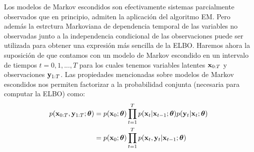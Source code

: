 Los modelos de Markov escondidos son efectivamente sistemas parcialmente observados que en principio, admiten la aplicación del algoritmo EM. Pero además la estrctura Markoviana de dependencia temporal de las variables no observadas junto a la independencia condicional de las observaciones puede ser utilizada para obtener una expresión más sencilla de la ELBO. Haremos ahora la suposición de que contamos con un modelo de Markov escondido en un intervalo de tiempos $t = 0, 1, ..., T$ para los cuales tenemos variables latentes $\mathbf{x}_{0:T}$ y observaciones $\mathbf{y}_{1:T}$. Las propiedades mencionadas sobre modelos de Markov escondidos nos permiten factorizar a la probabilidad conjunta (necesaria para computar la ELBO) como:
\begin{align}
    p(\mathbf{x}_{0:T}, \mathbf{y}_{1:T} ; \mbox{\boldmath$ \theta $}) &= p(\mathbf{x}_0 ; \mbox{\boldmath$ \theta $}) \prod_{t=1}^T p(\mathbf{x}_t | \mathbf{x}_{t-1} ; \mbox{\boldmath$ \theta $}) p(\mathbf{y}_t | \mathbf{x}_t ; \mbox{\boldmath$ \theta $}) \\
    &= p(\mathbf{x}_0 ; \mbox{\boldmath$ \theta $}) \prod_{t=1}^T p(\mathbf{x}_t, \mathbf{y}_t | \mathbf{x}_{t-1} ; \mbox{\boldmath$ \theta $})
\end{align}

